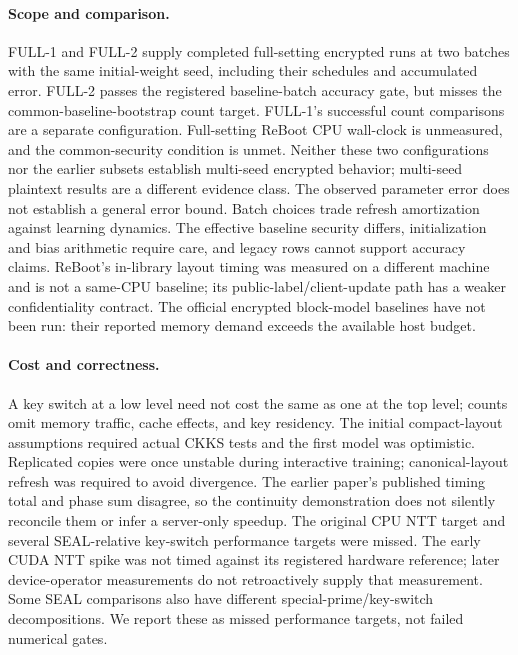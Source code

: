 \paragraph{Scope and comparison.}
FULL-1 and FULL-2 supply completed full-setting encrypted runs at two batches with the same initial-weight seed, including their schedules and accumulated error. FULL-2 passes the registered baseline-batch accuracy gate, but misses the common-baseline-bootstrap count target. FULL-1's successful count comparisons are a separate configuration. Full-setting ReBoot CPU wall-clock is unmeasured, and the common-security condition is unmet. Neither these two configurations nor the earlier subsets establish multi-seed encrypted behavior; multi-seed plaintext results are a different evidence class. The observed parameter error does not establish a general error bound. Batch choices trade refresh amortization against learning dynamics. The effective baseline security differs, initialization and bias arithmetic require care, and legacy rows cannot support accuracy claims. ReBoot's in-library layout timing was measured on a different machine and is not a same-CPU baseline; its public-label/client-update path has a weaker confidentiality contract. The official encrypted block-model baselines have not been run: their reported memory demand exceeds the available host budget.

\paragraph{Cost and correctness.}
A key switch at a low level need not cost the same as one at the top level; counts omit memory traffic, cache effects, and key residency. The initial compact-layout assumptions required actual CKKS tests and the first model was optimistic. Replicated copies were once unstable during interactive training; canonical-layout refresh was required to avoid divergence. The earlier paper's published timing total and phase sum disagree, so the continuity demonstration does not silently reconcile them or infer a server-only speedup. The original CPU NTT target and several SEAL-relative key-switch performance targets were missed. The early CUDA NTT spike was not timed against its registered hardware reference; later device-operator measurements do not retroactively supply that measurement. Some SEAL comparisons also have different special-prime/key-switch decompositions. We report these as missed performance targets, not failed numerical gates.

